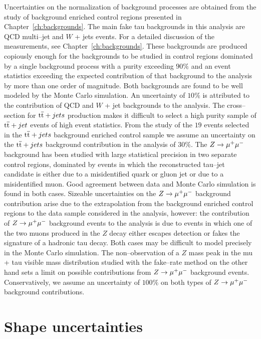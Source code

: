 Uncertainties on the normalization of background processes are obtained from the
study of background enriched control regions presented in
Chapter~\ref{ch:backgrounds}.  The main fake tau backgrounds in this analysis
are QCD multi--jet and $W$ + jets events.  For a detailed discussion of the
measurements, see Chapter~\ref{ch:backgrounds}.  These backgrounds are produced
copiously enough for the backgrounds to be studied in control regions dominated
by a single background process with a purity exceeding $90\%$ and an event
statistics exceeding the expected contribution of that background to the
analysis by more than one order of magnitude.  Both backgrounds are found to be
well modeled by the Monte Carlo simulation.  An uncertainty of $10\%$ is
attributed to the contribution of QCD and $W$ + jet backgrounds to the analysis.
The cross--section for $\mathrm{t}\overline{\mathrm{t}} + jets$ production makes it difficult to select a
high purity sample of $\mathrm{t}\overline{\mathrm{t}} + jet$ events of high event statistics.  From the
study of the $19$ events selected in the $\mathrm{t}\overline{\mathrm{t}} + jets$ background enriched
control sample we assume an uncertainty on the $\mathrm{t}\overline{\mathrm{t}} + jets$ background
contribution in the analysis of $30\%$.  The $Z \to \mu^+\mu^-$ background has been
studied with large statistical precision in two separate control regions,
dominated by events in which the reconstructed tau--jet candidate is either due
to a misidentified quark or gluon jet or due to a misidentified muon.  Good
agreement between data and Monte Carlo simulation is found in both cases.
Sizeable uncertainties on the $Z \to \mu^+\mu^-$ background contribution arise due to
the extrapolation from the background enriched control regions to the data
sample considered in the analysis, however: the contribution of $Z \to \mu^+\mu^-$
background events to the analysis is due to events in which one of the two muons
produced in the $Z$ decay either escapes detection or fakes the signature of a
hadronic tau decay.  Both cases may be difficult to model precisely in the Monte
Carlo simulation.  The non--observation of a $Z$ mass peak in the mu + tau
visible mass distribution studied with the fake--rate method on the other hand
sets a limit on possible contributions from $Z \to \mu^+\mu^-$ background events.
Conservatively, we assume an uncertainty of $100\%$ on both types of $Z \to \mu^+\mu^-$
background contributions.

\section{Shape uncertainties}

